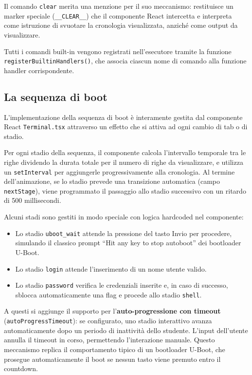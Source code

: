 
Il comando \texttt{clear} merita una menzione per il suo meccanismo: restituisce un marker speciale (\texttt{\_\_CLEAR\_\_}) che il componente React intercetta e interpreta come istruzione di svuotare la cronologia visualizzata, anziché come output da visualizzare.

Tutti i comandi built-in vengono registrati nell'esecutore tramite la funzione \texttt{registerBuiltinHandlers()}, che associa ciascun nome di comando alla funzione handler corrispondente.

\subsection{La sequenza di boot}

L'implementazione della sequenza di boot è interamente gestita dal componente React \texttt{Terminal.tsx} attraverso un effetto che si attiva ad ogni cambio di tab o di stadio.

Per ogni stadio della sequenza, il componente calcola l'intervallo temporale tra le righe dividendo la durata totale per il numero di righe da visualizzare, e utilizza un \texttt{setInterval} per aggiungerle progressivamente alla cronologia. Al termine dell'animazione, se lo stadio prevede una transizione automatica (campo \texttt{nextStage}), viene programmato il passaggio allo stadio successivo con un ritardo di 500 millisecondi.

Alcuni stadi sono gestiti in modo speciale con logica hardcoded nel componente:

\begin{itemize}
    \item Lo stadio \texttt{uboot\_wait} attende la pressione del tasto Invio per procedere, simulando il classico prompt ``Hit any key to stop autoboot'' dei bootloader U-Boot.
    \item Lo stadio \texttt{login} attende l'inserimento di un nome utente valido.
    \item Lo stadio \texttt{password} verifica le credenziali inserite e, in caso di successo, sblocca automaticamente una flag e procede allo stadio \texttt{shell}.
\end{itemize}

A questi si aggiunge il supporto per l'\textbf{auto-progressione con timeout} (\texttt{autoProgressTimeout}): se configurato, uno stadio interattivo avanza automaticamente dopo un periodo di inattività dello studente. L'input dell'utente annulla il timeout in corso, permettendo l'interazione manuale. Questo meccanismo replica il comportamento tipico di un bootloader U-Boot, che prosegue automaticamente il boot se nessun tasto viene premuto entro il countdown.

